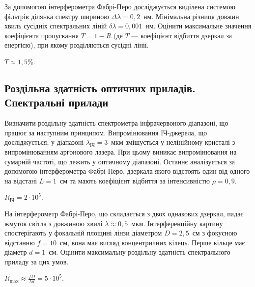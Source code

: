 \begin{problem}%
    За допомогою інтерферометра Фабрі-Перо досліджується виділена системою фільтрів ділянка спектру шириною $ \Delta\lambda = 0,2 $~нм. Мінімальна різниця довжин хвиль сусідніх спектральних ліній $ \delta\lambda = 0,001 $~нм. Оцінити максимальне значення коефіцієнта пропускання $T = 1- R$ (де $T$ --- коефіцієнт відбиття дзеркал за енергією), при якому розділяються сусідні лінії.
    \begin{solution}
        $T \approx 1,5$\%.
    \end{solution}
\end{problem}






\subsection*{Роздільна здатність оптичних приладів. Спектральні прилади}


\begin{problem}%
    Визначити роздільну здатність спектрометра інфрачервоного діапазоні, що працює за наступним принципом. Випромінювання ІЧ-джерела, що досліджується, у діапазоні $ \lambda_\text{ІЧ} = 3$~мкм змішується у нелінійному кристалі з випромінюванням аргонового лазера. При цьому виникає випромінювання на сумарній частоті, що лежить у оптичному діапазоні. Останнє аналізується за допомогою інтерферометра Фабрі-Перо, дзеркала якого відстоять один від одного на відстані $ L = 1 $~см та мають коефіцієнт відбиття за інтенсивністю $ \rho = 0,9  $.
    \begin{solution}
        $R_\text{ІЧ} = 2\cdot10^5$.
    \end{solution}
\end{problem}


\begin{problem}%
    На інтерферометр Фабрі-Перо, що складається з двох однакових
    дзеркал, падає жмуток світла з довжиною хвилі $ \lambda \approx  0,5 $~мкм.
    Інтерференційну картину спостерігають у фокальній площині лінзи
    діаметром $ D = 2,5 $~см з фокусною відстанню $ f = 10 $~см, вона має вигляд
    концентричних кілець. Перше кільце має діаметр $ d = 1 $~см. Оцінити
    максимальну роздільну здатність спектрального приладу за цих умов.
    \begin{solution}
        $R_{\max} \approx \frac{fD}{\lambda d} = 5\cdot10^5$.
    \end{solution}
\end{problem}


